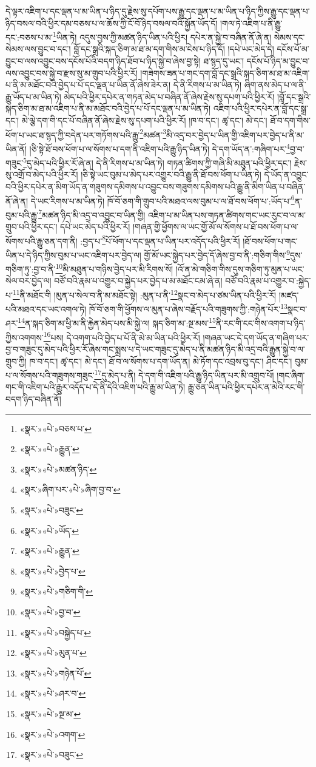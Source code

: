 དེ་ལྟར་འཇིག་པ་དང་ལྡན་པ་མ་ཡིན་པ་ཉིད་དུ་རྗེས་སུ་དཔོག་པས་རྒྱུ་དང་ལྡན་པ་མ་ཡིན་པ་ཉིད་ཀྱིས་རྒྱུ་དང་ལྡན་པ་ཉིད་བསལ་བའི་ཕྱིར་དམ་བཅས་པ་ལ་ཆོས་ཀྱི་ངོ་བོ་ཉིད་བསལ་བའི་སྐྱོན་ཡོད་དོ། །གལ་ཏེ་འཇིག་པ་ནི་རྒྱུ་དང་:བཅས་པ་མ་\footnote{«སྣར་»«པེ་»བཅས་པ་}ཡིན་ཏེ། འདུས་བྱས་ཀྱི་མཚན་ཉིད་ཡིན་པའི་ཕྱིར། དཔེར་ན་སྐྱེ་བ་བཞིན་ནོ་ཞེ་ན། སེམས་དང་སེམས་ལས་བྱུང་བ་དང་། བློ་དང་སྒྲའི་སྐད་ཅིག་མ་ཐ་མ་དག་གིས་མ་ངེས་པ་ཉིད་དོ། །དཔེ་ཡང་མེད་དེ། དངོས་པོ་མ་བྱུང་བ་ལས་འབྱུང་བས་དངོས་པོའི་བདག་ཉིད་ཐོབ་པ་ཉིད་སྐྱེ་བ་ཞེས་བྱ་སྟེ། ཐ་སྙད་དུ་ཡང་། དངོས་པོ་ཉིད་མ་བྱུང་བ་ལས་འབྱུང་བས་སྐྱེ་བ་རྫས་སུ་མ་གྲུབ་པའི་ཕྱིར་རོ། །གཟེགས་ཟན་པ་གང་དག་བློ་དང་སྒྲའི་སྐད་ཅིག་མ་ཐ་མ་འཇིག་པ་ནི་མ་མཐོང་བའི་བྱེད་པ་པོ་དང་ལྡན་པ་ཡིན་ནོ་ཞེས་ཟེར་ན། དེ་ནི་རིགས་པ་མ་ཡིན་ཏེ། ཞིག་ནས་མེད་པ་ལ་ནི་རྒྱུ་ཡོད་པ་མ་ཡིན་ཏེ། མེད་པའི་ཕྱིར་དཔེར་ན་གཏན་མེད་པ་བཞིན་ནོ་ཞེས་རྗེས་སུ་དཔག་པའི་ཕྱིར་རོ། །བློ་དང་སྒྲའི་སྐད་ཅིག་མ་ཐ་མ་འཇིག་པ་ནི་མ་མཐོང་བའི་བྱེད་པ་པོ་དང་ལྡན་པ་མ་ཡིན་ཏེ། འཇིག་པའི་ཕྱིར་དཔེར་ན་བློ་དང་སྒྲ་དང་། མེ་ལྕེ་དག་གི་དང་པོ་བཞིན་ནོ་ཞེས་རྗེས་སུ་དཔག་པའི་ཕྱིར་རོ། །ཁ་བ་དང་། ཚྭ་དང་། མེ་དང་། ཐོ་བ་དག་གིས་ཕོག་པ་ཡང་ཐ་སྙད་ཀྱི་བདེན་པར་གཏོགས་པའི་རྒྱུ་\footnote{«སྣར་»«པེ་»རྒྱུན་}མཚན་\footnote{«སྣར་»«པེ་»མཚན་ཉིད་}མི་འདྲ་བར་བྱེད་པ་ཡིན་གྱི་འཇིག་པར་བྱེད་པ་ནི་མ་ཡིན་ནོ། །ཅི་སྟེ་ཐོ་བས་ཕོག་པ་ལ་སོགས་པ་དག་ནི་འཇིག་པའི་རྒྱུ་ཉིད་ཡིན་ཏེ། དེ་དག་ཡོད་ན་:གཞིག་པར་\footnote{«སྣར་»ཞིག་པར་«པེ་»ཞིག་བྱ་བ་}བྱ་བ་གཟུང་\footnote{«སྣར་»«པེ་»བཟུང་}དུ་མེད་པའི་ཕྱིར་རོ་ཞེ་ན། དེ་ནི་རིགས་པ་མ་ཡིན་ཏེ། གཏན་ཚིགས་ཀྱི་གཞི་མི་མཐུན་པའི་ཕྱིར་དང་། རྗེས་སུ་འགྲོ་བ་མེད་པའི་ཕྱིར་རོ། །ཅི་སྟེ་ཡང་བུམ་པ་མེད་པར་འགྱུར་བའི་རྒྱུ་ནི་ཐོ་བས་ཕོག་པ་ཡིན་ཏེ། དེ་ཡོད་ན་འབྱུང་བའི་ཕྱིར་དཔེར་ན་མིག་ཡོད་ན་གཟུགས་དམིགས་པ་འབྱུང་བས་གཟུགས་དམིགས་པའི་རྒྱུ་ནི་མིག་ཡིན་པ་བཞིན་ནོ་ཞེ་ན། དེ་ཡང་རིགས་པ་མ་ཡིན་ཏེ། ཁོ་བོ་ཅག་གི་གྲུབ་པའི་མཐའ་ལས་བུམ་པ་ལ་ཐོ་བས་ཕོག་པ་:ཡོད་པ་\footnote{«སྣར་»«པེ་»ཡོད་}ན་བུམ་པའི་རྒྱུ་\footnote{«སྣར་»«པེ་»རྒྱུན་}མཚན་ཉིད་མི་འདྲ་བ་འབྱུང་བ་ཡིན་གྱི། འཇིག་པ་མ་ཡིན་པས་གཏན་ཚིགས་གང་ཡང་རུང་བ་ལ་མ་གྲུབ་པའི་ཕྱིར་དང་། དཔེ་ཡང་མེད་པའི་ཕྱིར་རོ། །གཞན་གྱི་ཕྱོགས་ལ་ཡང་གྱོ་མོ་ལ་སོགས་པ་ཐོ་བས་ཕོག་པ་ལ་སོགས་པའི་རྒྱུ་ཅན་དག་ནི། :བྱད་པ་\footnote{«སྣར་»«པེ་»བྱེད་པ་}པོ་ཕོག་པ་དང་ལྡན་པ་ཡིན་པར་འདོད་པའི་ཕྱིར་རོ། །ཐོ་བས་ཕོག་པ་གང་ཡིན་པ་དེ་ཉིད་ཀྱིས་བུམ་པ་ཡང་འཇིག་པར་བྱེད་ལ། གྱོ་མོ་ཡང་སྐྱེད་པར་བྱེད་དོ་ཞེས་བྱ་བ་ནི་:གཅིག་གིས་\footnote{«སྣར་»«པེ་»གཅིག་གི་}དུས་གཅིག་ཏུ་:བྱ་བ་ནི་\footnote{«སྣར་»«པེ་»བྱ་བ་}མི་མཐུན་པ་གཉིས་བྱེད་པར་མི་རིགས་སོ། །འོ་ན་མེ་གཅིག་གིས་དུས་གཅིག་ཏུ་མུན་པ་ཡང་སེལ་བར་བྱེད་ལ། བཙོ་བའི་རྣམ་པ་འགྱུར་བ་སྐྱེད་པར་བྱེད་པ་མ་མཐོང་ངམ་ཞེ་ན། བཙོ་བའི་རྣམ་པ་འགྱུར་བ་:སྐྱེད་པ་\footnote{«སྣར་»«པེ་»བསྐྱེད་པ་}ནི་མཐོང་གི །མུན་པ་སེལ་བ་ནི་མ་མཐོང་སྟེ། :མུན་པ་ནི་\footnote{«སྣར་»«པེ་»མུན་པ་}སྣང་བ་མེད་པ་ཙམ་ཡིན་པའི་ཕྱིར་རོ། །མཛད་པའི་མཐའ་དང་ཡང་འགལ་ཏེ། ཁོ་བོ་ཅག་གི་ཕྱོགས་ལ་མུན་པ་ཞེས་བརྗོད་པའི་གཟུགས་ཀྱི་:གཉེན་པོར་\footnote{«སྣར་»«པེ་»གཉེན་པོ་}སྣང་བ་ཤར་\footnote{«སྣར་»«པེ་»ཤར་བ་}ན་སྐད་ཅིག་མ་ཕྱི་མ་ནི་རྐྱེན་མེད་པས་མི་སྐྱེ་ལ། སྐད་ཅིག་མ་:སྔ་མས་\footnote{«སྣར་»«པེ་»སྔ་མ་}ནི་རང་གི་ངང་གིས་འགག་པ་ཉིད་ཀྱིས་འགགས་\footnote{«སྣར་»«པེ་»འགག་}པས། དེ་འགག་པའི་བྱེད་པ་པོ་ནི་མེ་མ་ཡིན་པའི་ཕྱིར་རོ། །གཞན་ཡང་དེ་དག་ཡོད་ན་གཞིག་པར་བྱ་བ་གཟུང་དུ་མེད་པའི་ཕྱིར་རོ་ཞེས་གང་སྨྲས་པ་དེ་ཡང་གཟུང་དུ་མེད་པ་ནི་མཚན་ཉིད་མི་འདྲ་བའི་རྒྱུན་སྐྱེ་བ་ལ་གྲུབ་ཀྱི། ཁ་བ་དང་། ཚྭ་དང་། མེ་དང་། ཐོ་བ་ལ་སོགས་པ་དག་ཡོད་ན། མེ་ཏོག་དང་འབྲས་བུ་དང་། ཤིང་དང་། བུམ་པ་ལ་སོགས་པའི་གཟུགས་གཟུང་\footnote{«སྣར་»«པེ་»བཟུང་}དུ་མེད་པ་ནི། དེ་དག་གི་འཇིག་པའི་རྒྱུ་ཉིད་ཡིན་པར་མི་འགྲུབ་པོ། །གང་ཞིག་གང་གི་འཇིག་པའི་རྒྱུར་འདོད་པ་དེ་ནི་དེའི་འཇིག་པའི་རྒྱུ་མ་ཡིན་ཏེ། རྒྱུ་ཅན་ཡིན་པའི་ཕྱིར་དཔེར་ན་མེའི་རང་གི་བདག་ཉིད་བཞིན་ནོ། 